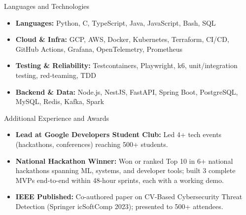 \documentclass[]{mcdowellcv}
\begin{document}
\begin{cvsection}{Languages and Technologies}
  \begin{cvsubsection}{}{}{}
    \begin{itemize}
      \item \textbf{Languages:} Python, C, TypeScript, Java, JavaScript, Bash, SQL
      \item \textbf{Cloud \& Infra:} GCP, AWS, Docker, Kubernetes, Terraform, CI/CD, GitHub Actions, Grafana, OpenTelemetry, Prometheus
      \item \textbf{Testing \& Reliability:} Testcontainers, Playwright, k6, unit/integration testing, red-teaming, TDD
      \item \textbf{Backend \& Data:} Node.js, NestJS, FastAPI, Spring Boot, PostgreSQL, MySQL, Redis, Kafka, Spark
    \end{itemize}
  \end{cvsubsection}
\end{cvsection}

\begin{cvsection}{Additional Experience and Awards}
  \begin{cvsubsection}{}{}{}
    \begin{itemize}
      \item \textbf{Lead at Google Developers Student Club:} Led 4+ tech events (hackathons, conferences) reaching 500+ students.
      \item \textbf{National Hackathon Winner:} Won or ranked Top 10 in 6+ national hackathons spanning ML, systems, and developer tools; built 3 complete MVPs end-to-end within 48-hour sprints, each with a working demo.
      \item \textbf{IEEE Published:} Co-authored paper on CV-Based Cybersecurity Threat Detection (Springer icSoftComp 2023); presented to 500+ attendees.
    \end{itemize}
  \end{cvsubsection}
\end{cvsection}
\end{document}
